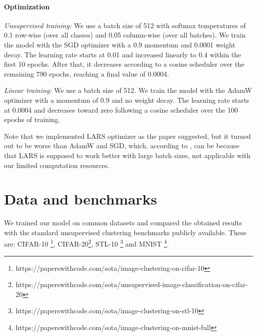 \documentclass{article}
\begin{document}
\paragraph{Optimization} \quad

\textit{Unsupervised training:} We use a batch size of 512 with softmax temperatures of 0.1 row-wise (over all classes) and 0.05 column-wise (over all batches). We train the model with the SGD optimizer with a 0.9 momentum and 0.0001 weight decay. The learning rate starts at 0.01 and increased linearly to 0.4 within the first 10 epochs. After that, it decreases according to a cosine scheduler over the remaining 790 epochs, reaching a final value of 0.0004.

\textit{Linear training:} We use a batch size of 512. We train the model with the AdamW optimizer with a momentum of 0.9 and no weight decay. The learning rate starts at 0.0004 and decreases toward zero following a cosine scheduler over the 100 epochs of training.

Note that we implemented LARS optimizer as the paper suggested, but it turned out to be worse than AdamW and SGD, which, according to \cite{simsiam}, can be because that LARS is supposed to work better with large batch sizes, not applicable with our limited computation resources.

\section{Data and benchmarks}
\label{sec:data}

We trained our model on common datasets and compared the obtained results with the standard unsupervised clustering benchmarks publicly available. These are: CIFAR-10 \cite{cifar_10}\footnote{https://paperswithcode.com/sota/image-clustering-on-cifar-10}, CIFAR-20\cite{cifar_100}\footnote{https://paperswithcode.com/sota/unsupervised-image-classification-on-cifar-20}, STL-10 \cite{stl_10} \footnote{https://paperswithcode.com/sota/image-clustering-on-stl-10} and MNIST \cite{mnist}\footnote{https://paperswithcode.com/sota/image-clustering-on-mnist-full}. 
\end{document}
